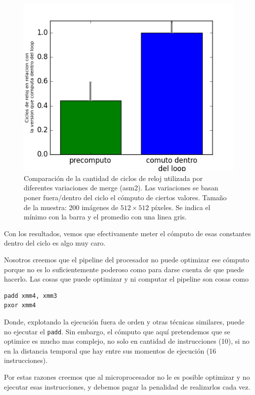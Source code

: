 \begin{figure}[H] 
	\centering
  \includegraphics[scale=0.7]{images/merge-afuera.png}
  \caption{Comparación de la cantidad de ciclos de reloj utilizada por diferentes variaciones de merge (asm2). Las variaciones se basan poner fuera/dentro del ciclo el cómputo de ciertos valores. Tamaño de la muestra: 200 imágenes de $512 \times 512$ píxeles. Se indica el mínimo con la barra y el promedio con una linea gris.}
\end{figure}

Con los resultados, vemos que efectivamente meter el cómputo de esas constantes dentro del ciclo es algo muy caro. 

Nosotros creemos que el pipeline del procesador no puede optimizar ese cómputo porque no es lo suficientemente poderoso como para darse cuenta de que puede hacerlo. Las cosas que puede optimizar y ni computar el pipeline son cosas como


\begin{lstlisting}
padd xmm4, xmm3
pxor xmm4
\end{lstlisting}

Donde, explotando la ejecución fuera de orden y otras técnicas similares, puede no ejecutar el \texttt{padd}. Sin embargo, el cómputo que aquí pretendemos que se optimice es mucho mas complejo, no solo en cantidad de instrucciones (10), si no en la distancia temporal que hay entre sus momentos de ejecución (16 instrucciones).

Por estas razones creemos que al microprocesador no le es posible optimizar y no ejecutar esas instrucciones, y debemos pagar la penalidad de realizarlos cada vez.
